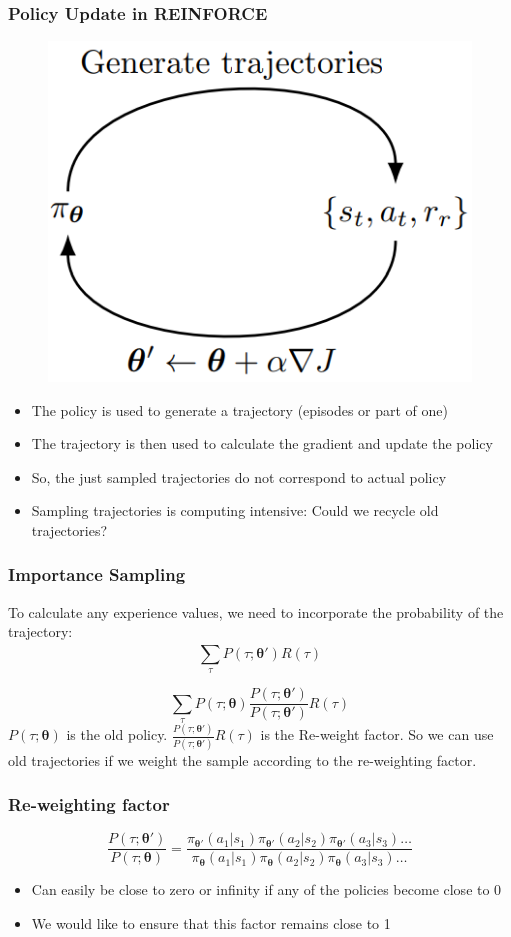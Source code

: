 \subsubsection*{Policy Update in REINFORCE}
\begin{figure}
    \includegraphics[width = 0.5\columnwidth]{figures/DeepReinforcementLearning3/PPOPolicyUpdate.png}
\end{figure}
\begin{itemize}
    \item The policy is used to generate a trajectory (episodes or part of one)
    \item The trajectory is then used to calculate the gradient and update the policy
    \item So, the just sampled trajectories do not correspond to actual policy
    \item Sampling trajectories is computing intensive: Could we recycle old trajectories?
\end{itemize}
\subsubsection*{Importance Sampling}
To calculate any experience values, we need to incorporate the probability of the trajectory:
\begin{equation*}
    \sum_{\tau}^{}P(\tau;\boldsymbol{\theta}')R(\tau)
\end{equation*}

\begin{equation*}
    \sum_{\tau}^{}P(\tau;\boldsymbol{\theta})\frac{P(\tau;\boldsymbol{\theta}')}{P(\tau;\boldsymbol{\theta}')}R(\tau)
\end{equation*}
\(P(\tau;\boldsymbol{\theta})\) is the old policy.
\(\frac{P(\tau;\boldsymbol{\theta}')}{P(\tau;\boldsymbol{\theta}')}R(\tau)\) is the Re-weight factor.
So we can use old trajectories if we weight the sample according to the re-weighting factor.
\subsubsection*{Re-weighting factor}
\[
\frac{P(\tau;\boldsymbol{\theta}')}{P(\tau;\boldsymbol{\theta})} = \frac{
    \pi_{\boldsymbol{\theta}'}(a_1|s_1) \pi_{\boldsymbol{\theta}'}(a_2|s_2) \pi_{\boldsymbol{\theta}'}(a_3|s_3) \dots
}{
    \pi_{\boldsymbol{\theta}}(a_1|s_1) \pi_{\boldsymbol{\theta}}(a_2|s_2) \pi_{\boldsymbol{\theta}}(a_3|s_3) \dots
}
\]
\begin{itemize}
    \item Can easily be close to zero or infinity if any of the policies become close to 0
    \item We would like to ensure that this factor remains close to 1
\end{itemize}
